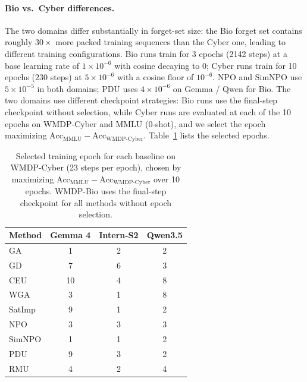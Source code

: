 \paragraph{Bio vs.\ Cyber differences.} The two domains differ substantially in forget-set size: the Bio forget set contains roughly $30\times$ more packed training sequences than the Cyber one, leading to different training configurations. Bio runs train for 3 epochs (2142 steps) at a base learning rate of $1 \times 10^{-6}$ with cosine decaying to 0; Cyber runs train for 10 epochs (230 steps) at $5 \times 10^{-6}$ with a cosine floor of $10^{-6}$. NPO and SimNPO use $5 \times 10^{-5}$ in both domains; PDU uses $4 \times 10^{-6}$ on Gemma / Qwen for Bio. The two domains use different checkpoint strategies: Bio runs use the final-step checkpoint without selection, while Cyber runs are evaluated at each of the 10 epochs on WMDP-Cyber and MMLU (0-shot), and we select the epoch maximizing $\mathrm{Acc}_\mathrm{MMLU} - \mathrm{Acc}_\mathrm{WMDP\text{-}Cyber}$. Table~\ref{tab:baseline-epochs} lists the selected epochs.

\begin{table}[t]
\centering
\caption{Selected training epoch for each baseline on WMDP-Cyber (23 steps per epoch), chosen by maximizing $\mathrm{Acc}_\mathrm{MMLU} - \mathrm{Acc}_\mathrm{WMDP\text{-}Cyber}$ over 10 epochs. WMDP-Bio uses the final-step checkpoint for all methods without epoch selection.}
\label{tab:baseline-epochs}
\begin{tabular}{lccc}
\toprule
Method & Gemma 4 & Intern-S2 & Qwen3.5 \\
\midrule
GA & 1 & 2 & 2 \\
GD & 7 & 6 & 3 \\
CEU & 10 & 4 & 8 \\
WGA & 3 & 1 & 8 \\
SatImp & 9 & 1 & 2 \\
NPO & 3 & 3 & 3 \\
SimNPO & 1 & 1 & 2 \\
PDU & 9 & 3 & 2 \\
RMU & 4 & 2 & 4 \\
\bottomrule
\end{tabular}
\end{table}
